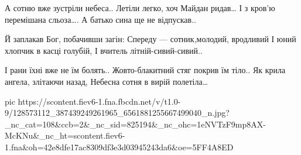  
 
 
 
 


\begin{multicols}{2}
	\obeycr
А сотню вже зустріли небеса..
Летіли легко, хоч Майдан ридав…
І з кров'ю перемішана сльоза….
А батько сина ще не відпускав..

Й заплакав Бог, побачивши загін:
Спереду — сотник,молодий, вродливий
І юний хлопчик в касці голубій,
І вчитель літній-сивий-сивий..

І рани їхні вже не їм болять..
Жовто-блакитний стяг покрив їм тіло..
Як крила ангела, злітаючи назад,
Небесна сотня в вирій полетіла…
	\restorecr
\end{multicols}

\ifcmt
pic https://scontent.fiev6-1.fna.fbcdn.net/v/t1.0-9/128573112_387439249261965_6561881255667499040_n.jpg?_nc_cat=108&ccb=2&_nc_sid=825194&_nc_ohc=1eNVTzF9mp8AX-McKNu&_nc_ht=scontent.fiev6-1.fna&oh=42e8dfe17ac8309df3e3d03945243da6&oe=5FF4A8ED
\fi
